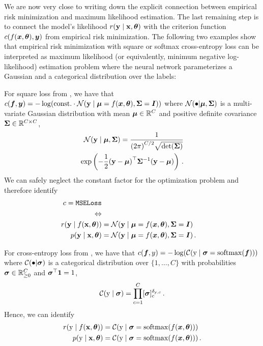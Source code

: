 We are now very close to writing down the explicit connection between empirical risk minimization and maximum likelihood estimation.
The last remaining step is to connect the model's likelihood $r({\mathbf{y}} \mid {\mathbf{x}}, {\bm{\theta}})$ with the criterion function $c(f({\bm{x}}, {\bm{\theta}}), {\bm{y}})$ from empirical risk minimization.
The following two examples show that empirical risk minimization with square or softmax cross-entropy loss can be interpreted as maximum likelihood (or equivalently, minimum negative log-likelihood) estimation problem where the neural network parameterizes a Gaussian and a categorical distribution over the labels:

\begin{example}\label{ex:square_loss_probabilistic}
  For square loss from , we have that $c({\bm{f}}, {\bm{y}}) = - \log( \mathrm{const.}
  \cdot {\mathcal{N}}({\mathbf{y}} \mid {\bm{\mu}} = f({\bm{x}}, {\bm{\theta}}), {\bm{\Sigma}} = {\bm{I}}))$ where ${\mathcal{N}}(\bullet | {\bm{\mu}}, {\bm{\Sigma}})$ is a multi-variate Gaussian distribution with mean ${\bm{\mu}} \in {\mathbb{R}}^C$ and positive definite covariance ${\bm{\Sigma}} \in {\mathbb{R}}^{C \times C}$,
  \begin{align*}
    {\mathcal{N}}({\mathbf{y}} \mid {\bm{\mu}}, {\bm{\Sigma}})
    =
    \frac{1}{{(2\pi)}^{C/2} \sqrt{\det({\bm{\Sigma}})}}
    \\
    \exp\left( -\frac{1}{2} {({\mathbf{y}} - {\bm{\mu}})}^\top {\bm{\Sigma}}^{-1} ({\mathbf{y}} - {\bm{\mu}}) \right)\,.
  \end{align*}
  We can safely neglect the constant factor for the optimization problem and therefore identify
  \begin{align*}
    c = \text{\texttt{MSELoss}}
    \\
    \Leftrightarrow
    \\
    r({\mathbf{y}} \mid f({\mathbf{x}}, {\bm{\theta}})) &= {\mathcal{N}}({\mathbf{y}} \mid {\bm{\mu}} = f({\bm{x}}, {\bm{\theta}}), {\bm{\Sigma}} = {\bm{I}})\,
    \\
    p({\mathbf{y}} \mid {\mathbf{x}}, {\bm{\theta}}) &= {\mathcal{N}}({\mathbf{y}} \mid {\bm{\mu}} = f({\bm{x}}, {\bm{\theta}}), {\bm{\Sigma}} = {\bm{I}})\,.
  \end{align*}
\end{example}

\begin{example}\label{ex:cross_entropy_loss_probabilistic}
  For cross-entropy loss from , we have that $c({\bm{f}}, y) = - \log( {\mathcal{C}}({\textnormal{y}} \mid {\bm{\sigma}} = \mathrm{softmax}({\bm{f}}) ))$ where ${\mathcal{C}}(\bullet | {\bm{\sigma}})$ is a categorical distribution over $\{1, \dots, C\}$ with probabilities ${\bm{\sigma}} \in {\mathbb{R}}^C_{\ge 0}$ and ${\bm{\sigma}}^\top {\bm{1}} = 1$,
  \begin{align*}
    {\mathcal{C}}({\textnormal{y}} \mid {\bm{\sigma}})
    =
    \prod_{c=1}^C [{\bm{\sigma}}]_c^{\delta_{{\textnormal{y}},c}}\,.
  \end{align*}
  Hence, we can identify
  \begin{align*}
    r({\textnormal{y}} \mid f({\mathbf{x}}, {\bm{\theta}})) &= {\mathcal{C}}({\textnormal{y}} \mid {\bm{\sigma}} = \mathrm{softmax}(f({\bm{x}}, {\bm{\theta}})))\,
    \\
    p({\textnormal{y}} \mid {\mathbf{x}}, {\bm{\theta}}) &= {\mathcal{C}}({\textnormal{y}} \mid {\bm{\sigma}} = \mathrm{softmax}(f({\bm{x}}, {\bm{\theta}})))\,.
  \end{align*}
\end{example}
